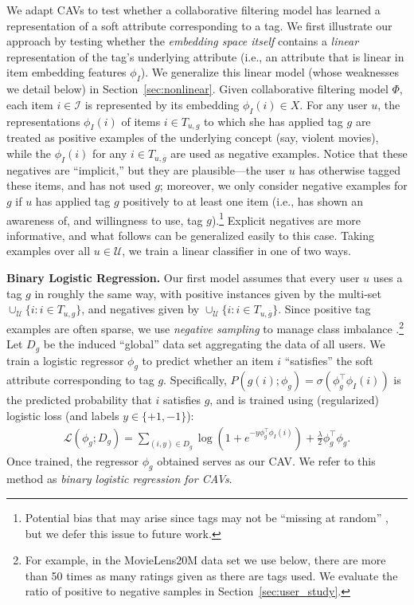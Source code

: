\documentclass[manuscript,screen,nonacm]{acmart}
\newcommand{\1}{{\mathbf 1}}
\newcommand{\calU}{\mathcal{U}}
\newcommand{\calI}{\mathcal{I}}
\newcommand{\calL}{\mathcal{L}}
\newcommand{\olg}{\overline{g}}
\theoremstyle{TheoremNum}
\begin{document}
We adapt CAVs
to test whether a collaborative filtering model has learned a representation of a soft attribute corresponding to a tag. We first illustrate our approach by testing whether the \emph{embedding space itself} contains a \emph{linear} representation of the tag's underlying attribute (i.e., an attribute that is linear in item embedding features $\phi_I$).
We generalize this linear model (whose weaknesses we detail below) in Section~\ref{sec:nonlinear}.
Given collaborative filtering model $\Phi$, each item $i\in\calI$ is represented by its embedding $\phi_I(i)\in X$. For any user $u$, the representations $\phi_I(i)$ of items $i\in T_{u,g}$ to which she has applied tag $g$ are treated as positive examples of the underlying concept (say, violent movies), while the $\phi_I(i)$ for any $i\in T_{u,\olg}$ are used as negative examples. Notice that these negatives are ``implicit,'' but they are plausible---the user $u$ has otherwise tagged these items, and has not used $g$; moreover, we only consider negative examples for $g$ if $u$ has applied tag $g$ positively to at least one item (i.e., has shown an awareness of, and willingness to use, tag $g$).\footnote{Potential bias that may arise since tags may not be ``missing at random'' \cite{marlin07}, but we defer this issue to future work.}  Explicit negatives are more informative, and what follows can be generalized easily to this case. Taking examples over all $u\in\calU$, we train a linear classifier in one of two ways.


\vskip 2mm
\noindent
\textbf{Binary Logistic Regression.}\hspace*{2mm}
Our first model assumes that every user $u$ uses a tag $g$ in roughly the same way, with positive instances given by the multi-set $\cup_\calU \{i: i\in T_{u,g}\}$, and negatives given by
$\cup_\calU \{i: i\in T_{u,\olg}\}$. Since positive tag examples are often sparse, we
use \emph{negative sampling} to manage class imbalance \cite{mikolov:nips13,yangEtAl:www20}.\footnote{For example, in the MovieLens20M data set we use below, there are more than 50 times as many ratings given as there are tags used. We evaluate the ratio of positive to negative samples in Section~\ref{sec:user_study}.} Let $D_g$ be the induced ``global'' data set aggregating the data of all users. We train a logistic regressor $\phi_g$ to predict whether an item $i$ ``satisfies'' the soft attribute corresponding to tag $g$. Specifically, $P(g(i);\phi_g) = \sigma(\phi_g^\top \phi_I(i))$ is the predicted probability that $i$ satisfies $g$, and is trained using (regularized) logistic loss (and labels {\small $y \in \{+1, -1\}$}):
\begin{align}
\calL(\phi_g; D_g) =  \sum_{(i,y)\in D_g} \log(1 + e^{-y \phi_g^\top \phi_I(i)}) + \frac{\lambda}{2} \phi_g^\top \phi_g.
\label{eq:binaryloss}
\end{align}
Once trained, the regressor $\phi_g$ obtained serves as our CAV.
We refer to this method as \emph{binary logistic regression for CAVs}.
\end{document}
